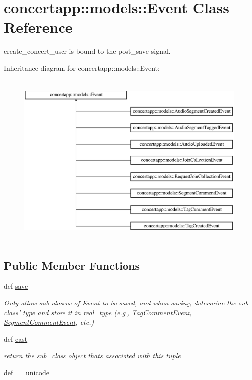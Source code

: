 \hypertarget{classconcertapp_1_1models_1_1_event}{
\section{concertapp::models::Event Class Reference}
\label{classconcertapp_1_1models_1_1_event}
}


create\_\-concert\_\-user is bound to the post\_\-save signal.  


Inheritance diagram for concertapp::models::Event:\begin{figure}[H]
\begin{center}
\leavevmode
\includegraphics[height=8.600683cm]{classconcertapp_1_1models_1_1_event}
\end{center}
\end{figure}
\subsection*{Public Member Functions}
\begin{DoxyCompactItemize}
\item 
def \hyperlink{classconcertapp_1_1models_1_1_event_af0d607331c24f45ead57177e0833117d}{save}
\begin{DoxyCompactList}\small\item\em Only allow sub classes of \hyperlink{classconcertapp_1_1models_1_1_event}{Event} to be saved, and when saving, determine the sub class' type and store it in real\_\-type (e.g., \hyperlink{classconcertapp_1_1models_1_1_tag_comment_event}{TagCommentEvent}, \hyperlink{classconcertapp_1_1models_1_1_segment_comment_event}{SegmentCommentEvent}, etc.) \item\end{DoxyCompactList}\item 
def \hyperlink{classconcertapp_1_1models_1_1_event_aff73a47980844295e0a802bf65f32169}{cast}
\begin{DoxyCompactList}\small\item\em return the sub\_\-class object thats associated with this tuple \item\end{DoxyCompactList}\item 
def \hyperlink{classconcertapp_1_1models_1_1_event_a9a3f3dc074ee05120d953de9845080d0}{\_\-\_\-unicode\_\-\_\-}
\end{DoxyCompactItemize}

